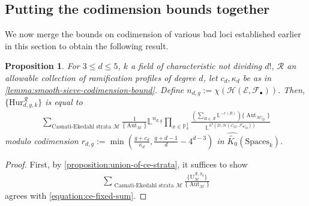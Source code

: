 \documentclass[12 pt]{amsart}
\newcommand{\rboxed}[1]{#1}
\theoremstyle{plain}
\newtheorem{proposition}[theorem]{Proposition}
\theoremstyle{definition}
\theoremstyle{remark}
\numberwithin{equation}{section}
\newcommand\bl{\mathbb L}
\newcommand\bp{\mathbb P}
\newcommand\sce{\mathscr E}
\newcommand\scf{\mathscr F}
\newcommand\sch{\mathscr H}
\newcommand\rhur[4]{\mathrm{Hur}_{#1,#2,#3}^{#4}} %
\newcommand\ce{\mathscr M} %
\newcommand\ramlocus[2]{\mathrm{U}_{#1}^{#2}} %
\newcommand\systemdim[2]{n_{#1,#2}} %
\newcommand\codimbound[2]{r_{#1,#2}} %
\newcommand\grcSpaces{\widehat{\widetilde{K_0}}(\mathrm{Spaces}_k)} %
\DeclareMathOperator\aut{Aut}
\begin{document}
\subsection{Putting the codimension bounds together}
\label{subsection:merging-codimension-bounds}
We now merge the bounds on codimension of various bad loci established
earlier in this section to obtain the following result.

\begin{proposition} \label{proposition:sieved-hur-class} For $3 \leq d \leq 5$,
	$k$ a field of characteristic not dividing $d!$, $\mathcal R$ an
	allowable collection of ramification profiles of degree $d$, let $c_d,
	\kappa_d$
	be as in \autoref{lemma:smooth-sieve-codimension-bound}.  Define
	$\rboxed{\systemdim d g} := \chi\left( \sch(\sce, \scf_\bullet )\right)$.
		Then, $\{\rhur d g k{\mathcal R}\}$ is equal to \begin{align}
			\label{equation:ce-fixed-sum} \sum_{\text{
			Casnati-Ekedahl strata }\ce} \frac{1}{\{\aut_{\ce}\}}
			\bl^{\systemdim d g} \prod_{x \in \bp^1_k} \frac{\left(
			\sum_{R \in \mathcal R} \bl^{-r(R)} \right)
		\{\aut_{\ce|_D}\}}{\bl^{h^0(D, \sch(\sce|_D, \scf_\bullet|_D))}}
	\end{align} modulo codimension $\codimbound d g := \min(\frac{g + c_d}{\kappa_d}, \frac{g +
d-1}{d} - 4^{d-3})$ in $\grcSpaces$.  \end{proposition} \begin{proof} First, by
	\autoref{proposition:union-of-ce-strata}, it suffices to show
	\begin{align} 
		\label{equation:sd-strata-sum-reduction}	
		\sum_{\text{ Casnati-Ekedahl strata }\ce}
	\frac{\{\ramlocus \ce {\mathcal R, S_d}\}}{\{\aut_{\ce}\}} \end{align} agrees
	with \eqref{equation:ce-fixed-sum}.


\end{proof}
\end{document}
